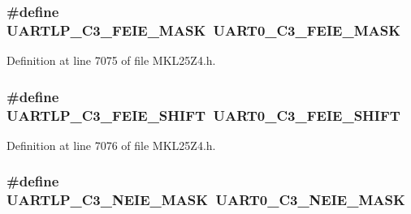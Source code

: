 \subsubsection[{\texorpdfstring{U\+A\+R\+T\+L\+P\+\_\+\+C3\+\_\+\+F\+E\+I\+E\+\_\+\+M\+A\+SK}{UARTLP_C3_FEIE_MASK}}]{\setlength{\rightskip}{0pt plus 5cm}\#define U\+A\+R\+T\+L\+P\+\_\+\+C3\+\_\+\+F\+E\+I\+E\+\_\+\+M\+A\+SK~{\bf U\+A\+R\+T0\+\_\+\+C3\+\_\+\+F\+E\+I\+E\+\_\+\+M\+A\+SK}}\hypertarget{group___backward___compatibility___symbols_ga06e90c952858ab6b2a6e8fec451fed4a}{}\label{group___backward___compatibility___symbols_ga06e90c952858ab6b2a6e8fec451fed4a}


Definition at line 7075 of file M\+K\+L25\+Z4.\+h.

\subsubsection[{\texorpdfstring{U\+A\+R\+T\+L\+P\+\_\+\+C3\+\_\+\+F\+E\+I\+E\+\_\+\+S\+H\+I\+FT}{UARTLP_C3_FEIE_SHIFT}}]{\setlength{\rightskip}{0pt plus 5cm}\#define U\+A\+R\+T\+L\+P\+\_\+\+C3\+\_\+\+F\+E\+I\+E\+\_\+\+S\+H\+I\+FT~{\bf U\+A\+R\+T0\+\_\+\+C3\+\_\+\+F\+E\+I\+E\+\_\+\+S\+H\+I\+FT}}\hypertarget{group___backward___compatibility___symbols_ga47332e2095915eede18d8b2e44bc08d3}{}\label{group___backward___compatibility___symbols_ga47332e2095915eede18d8b2e44bc08d3}


Definition at line 7076 of file M\+K\+L25\+Z4.\+h.

\subsubsection[{\texorpdfstring{U\+A\+R\+T\+L\+P\+\_\+\+C3\+\_\+\+N\+E\+I\+E\+\_\+\+M\+A\+SK}{UARTLP_C3_NEIE_MASK}}]{\setlength{\rightskip}{0pt plus 5cm}\#define U\+A\+R\+T\+L\+P\+\_\+\+C3\+\_\+\+N\+E\+I\+E\+\_\+\+M\+A\+SK~{\bf U\+A\+R\+T0\+\_\+\+C3\+\_\+\+N\+E\+I\+E\+\_\+\+M\+A\+SK}}\hypertarget{group___backward___compatibility___symbols_ga5b1c0f5de0179b86f7efd474133a5838}{}\label{group___backward___compatibility___symbols_ga5b1c0f5de0179b86f7efd474133a5838}


